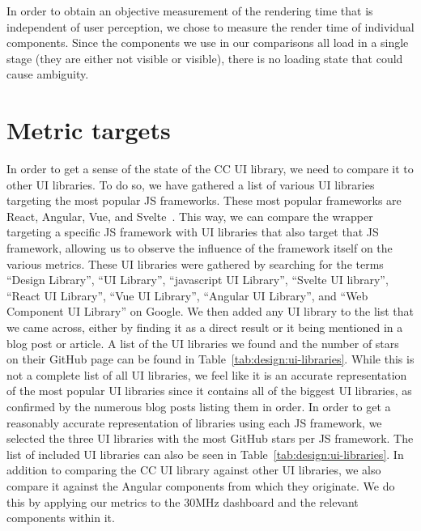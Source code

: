 In order to obtain an objective measurement of the rendering time that is independent of user perception, we chose to measure the render time of individual components. Since the components we use in our comparisons all load in a single stage (they are either not visible or visible), there is no loading state that could cause ambiguity.

\section{Metric targets}
In order to get a sense of the state of the CC UI library, we need to compare it to other UI libraries. To do so, we have gathered a list of various UI libraries targeting the most popular JS frameworks. These most popular frameworks are React, Angular, Vue, and Svelte~. This way, we can compare the wrapper targeting a specific JS framework with UI libraries that also target that JS framework, allowing us to observe the influence of the framework itself on the various metrics. These UI libraries were gathered by searching for the terms ``Design Library'', ``UI Library'', ``javascript UI Library'', ``Svelte UI library'', ``React UI Library'', ``Vue UI Library'', ``Angular UI Library'', and ``Web Component UI Library'' on Google. We then added any UI library to the list that we came across, either by finding it as a direct result or it being mentioned in a blog post or article. A list of the UI libraries we found and the number of stars on their GitHub page can be found in Table~\ref{tab:design:ui-libraries}. While this is not a complete list of all UI libraries, we feel like it is an accurate representation of the most popular UI libraries since it contains all of the biggest UI libraries, as confirmed by the numerous blog posts listing them in order. In order to get a reasonably accurate representation of libraries using each JS framework, we selected the three UI libraries with the most GitHub stars per JS framework. The list of included UI libraries can also be seen in Table~\ref{tab:design:ui-libraries}. In addition to comparing the CC UI library against other UI libraries, we also compare it against the Angular components from which they originate. We do this by applying our metrics to the 30MHz dashboard and the relevant components within it.

